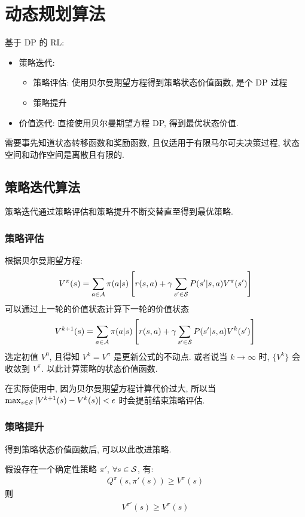 \newpage
\section{动态规划算法}

基于 DP 的 RL:
\begin{itemize}
    \item 策略迭代:
    \begin{itemize}
        \item 策略评估: 使用贝尔曼期望方程得到策略状态价值函数, 是个 DP 过程
        \item 策略提升
    \end{itemize}
    \item 价值迭代: 直接使用贝尔曼期望方程 DP, 得到最优状态价值. 
\end{itemize}

需要事先知道状态转移函数和奖励函数, 且仅适用于有限马尔可夫决策过程, 状态空间和动作空间是离散且有限的. 


\subsection{策略迭代算法}
策略迭代通过策略评估和策略提升不断交替直至得到最优策略.


\subsubsection{策略评估}
根据贝尔曼期望方程:
\begin{align*}
    V^\pi(s)=\sum_{a\in\mathcal{A}}\pi(a|s) \left[ r(s,a) + \gamma \sum_{s'\in\mathcal{S}} P(s'|s, a)V^\pi(s') \right]
\end{align*}
可以通过上一轮的价值状态计算下一轮的价值状态
\begin{align*}
    V^{k+1}(s)=\sum_{a\in\mathcal{A}}\pi(a|s) \left[ r(s,a) + \gamma \sum_{s'\in\mathcal{S}} P(s'|s, a)V^{k}(s') \right]
\end{align*}
选定初值 $V^0$, 且得知 $V^k=V^\pi$ 是更新公式的不动点. 或者说当 $k\to\infty$ 时, $\{ V^k \}$ 会收敛到 $V^\pi$. 以此计算策略的状态价值函数. 

在实际使用中, 因为贝尔曼期望方程计算代价过大, 所以当 $\max_{s\in\mathcal{S}}| V^{k+1}(s)-V^k(s) |<\epsilon$ 时会提前结束策略评估. 

\subsubsection{策略提升}
得到策略状态价值函数后, 可以以此改进策略. 

\begin{theorem}[策略提升定理]
    假设存在一个确定性策略 $\pi'$, $\forall s\in\mathcal{S}$, 有:
    \begin{align*}
        Q^\pi(s, \pi'(s))\ge V^\pi(s)
    \end{align*}
    则
    \begin{align*}
        V^{\pi'}(s)\ge V^\pi(s)
    \end{align*}
\end{theorem}


